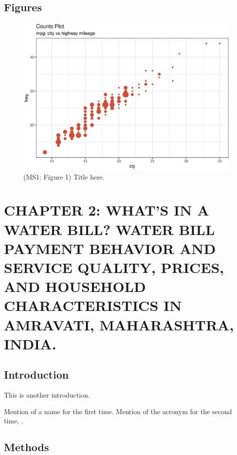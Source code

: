 \documentclass[12pt,report]{uncdissertation}
\newcommand{\blandscape}{\begin{landscape}}
\newcommand{\elandscape}{\end{landscape}}
\begin{document}
\blandscape

\hypertarget{figures}{%
\section{Figures}\label{figures}}

\begin{figure}[H]
\centering
\caption{(MS1: Figure 1) Title here.}
\includegraphics{includes/figures/fig1.eps}
\end{figure}

\elandscape

\chapter{\uppercase{Chapter 2: What's in a Water Bill? Water bill payment behavior and service quality, prices, and household characteristics in Amravati, Maharashtra, India.}}

\hypertarget{introduction-2}{%
\section{Introduction}\label{introduction-2}}

This is another introduction.

Mention of a name  for the first time. Mention of the acronym
for the second time, .

\hypertarget{methods-1}{%
\section{Methods}\label{methods-1}}
\end{document}
